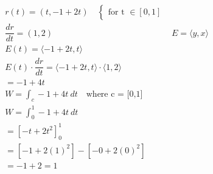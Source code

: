 \documentclass[12pt,a4paper]{article}
\begin{document}
\begin{enumerate}
\begin{align*}
	& r(t) = (t, -1 + 2t)\quad
	\begin{cases}
	\text{for t } \in [0,1]
	\end{cases} \\
	&\dfrac{dr}{dt} = (1 , 2)
	& E = \langle y , x \rangle \\
	& E(t) = \langle -1 + 2t , t \rangle \\
	& E(t) \cdot \dfrac{dr}{dt} = \langle -1 + 2t , t \rangle \cdot \langle 1 , 2 \rangle\\
	& = -1 + 4t \\
	& W = \int_c - 1 + 4t~dt \quad \text{where c = [0,1]} \\
	& W = \int^1_0 -1 + 4t ~ dt \\
	& = \left[-t + 2t^ 2 \right]_0^1 \\
	& = \left[-1 + 2(1)^ 2 \right] - \left[-0 + 2(0)^ 2 \right] \\
	& = -1 + 2 = 1
	\end{align*}
\end{enumerate}
\end{document}
